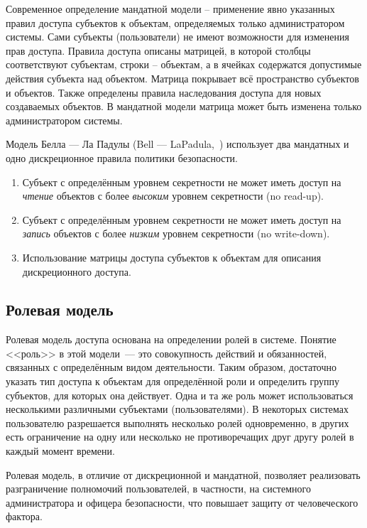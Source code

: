 Современное определение мандатной модели -- применение явно указанных правил доступа субъектов к объектам, определяемых только администратором системы. Сами субъекты (пользователи) не имеют возможности для изменения прав доступа. Правила доступа описаны матрицей, в которой столбцы соответствуют субъектам, строки -- объектам, а в ячейках содержатся допустимые действия субъекта над объектом. Матрица покрывает всё пространство субъектов и объектов. Также определены правила наследования доступа для новых создаваемых объектов. В мандатной модели матрица может быть изменена только администратором системы.

Модель Белла --- Ла Падулы (Bell --- LaPadula,~\cite{Bell:LaPadula:1973, Bell:LaPadula:1976}) использует два мандатных и одно дискреционное правила политики безопасности.
\begin{enumerate}
    \item Субъект с определённым уровнем секретности не может иметь доступ на \emph{чтение} объектов с более \emph{высоким} уровнем секретности (no read-up).
    \item Субъект с определённым уровнем секретности не может иметь доступ на \emph{запись} объектов с более \emph{низким} уровнем секретности (no write-down).
    \item Использование матрицы доступа субъектов к объектам для описания дискреционного доступа.
\end{enumerate}

\subsection{Ролевая модель}

Ролевая модель доступа основана на определении ролей в системе. Понятие <<роль>> в этой модели~--- это совокупность действий и обязанностей, связанных с определённым видом деятельности. Таким образом, достаточно указать тип доступа к объектам для определённой роли и определить группу субъектов, для которых она действует.
Одна и та же роль может использоваться несколькими различными субъектами (пользователями). В некоторых системах пользователю разрешается выполнять несколько ролей одновременно, в других есть ограничение на одну или несколько не противоречащих друг другу ролей в каждый момент времени.

Ролевая модель, в отличие от дискреционной и мандатной, позволяет реализовать разграничение полномочий пользователей, в частности, на системного администратора и офицера безопасности, что повышает защиту от человеческого фактора.
